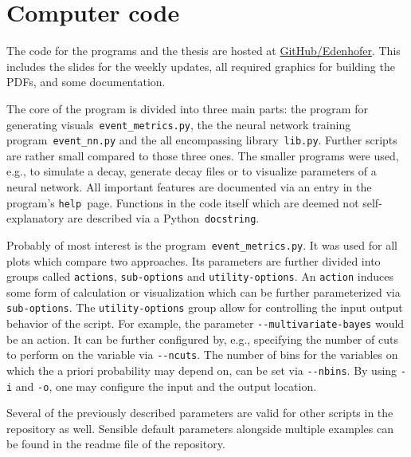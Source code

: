 \chapter{Computer code}
\label{chap:computer_code}

The code for the programs and the thesis are hosted at \href{https://github.com/Edenhofer/PID-boost}{GitHub/Edenhofer}. This includes the slides for the weekly updates, all required graphics for building the PDFs, and some documentation.

The core of the program is divided into three main parts: the program for generating visuals~\lstinline|event_metrics.py|, the the neural network training program~\lstinline|event_nn.py| and the all encompassing library~\lstinline|lib.py|. Further scripts are rather small compared to those three ones. The smaller programs were used, e.g., to simulate a decay, generate decay files or to visualize parameters of a neural network. All important features are documented via an entry in the program's \lstinline|help|~page. Functions in the code itself which are deemed not self-explanatory are described via a Python~\lstinline|docstring|.

Probably of most interest is the program~\lstinline|event_metrics.py|. It was used for all plots which compare two approaches. Its parameters are further divided into groups called \lstinline|actions|, \lstinline|sub-options| and \lstinline|utility-options|. An \lstinline|action| induces some form of calculation or visualization which can be further parameterized via \lstinline|sub-options|. The \lstinline|utility-options| group allow for controlling the input output behavior of the script.
For example, the parameter \lstinline|--multivariate-bayes| would be an action. It can be further configured by, e.g., specifying the number of cuts to perform on the variable via \lstinline|--ncuts|. The number of bins for the variables on which the a priori probability may depend on, can be set via \lstinline|--nbins|. By using \lstinline|-i| and \lstinline|-o|, one may configure the input and the output location.

Several of the previously described parameters are valid for other scripts in the repository as well. Sensible default parameters alongside multiple examples can be found in the readme file of the repository.
